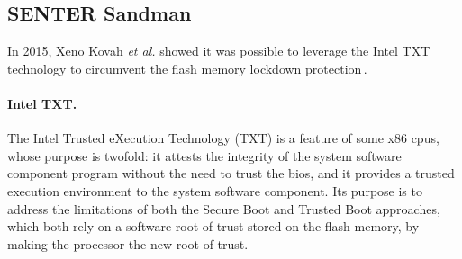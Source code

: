 \subsection{SENTER Sandman}
\label{subsec:usecase:hse:sandman}

In 2015, Xeno Kovah \emph{et al.} showed it was possible to leverage the Intel
TXT technology to circumvent the flash memory lockdown
protection\,\cite{kovah2015senter}.

\paragraph{Intel TXT.}
%
The Intel Trusted eXecution Technology (TXT)\cite{intel2015txt} is a feature of
some x86 \acp{cpu}, whose purpose is twofold: it attests the integrity of the
system software component program without the need to trust the \ac{bios}, and
it provides a trusted execution environment to the system software component.
%
Its purpose is to address the limitations of both the Secure Boot and Trusted
Boot approaches, which both rely on a software root of trust stored on the flash
memory, by making the processor the new root of trust.
%

